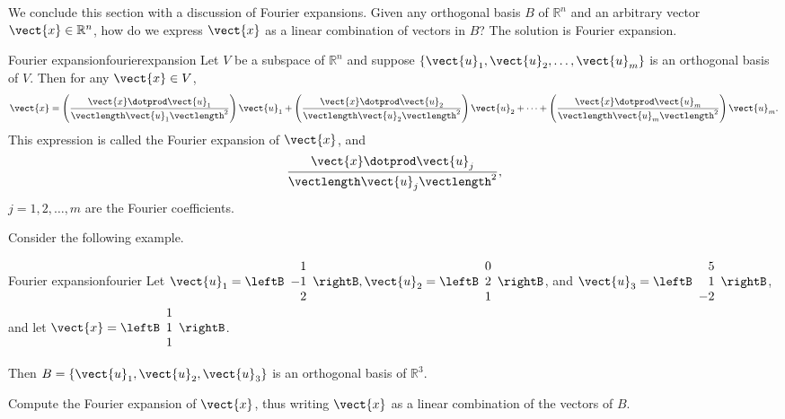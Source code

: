 We conclude this section with a discussion of Fourier expansions. Given any orthogonal basis $B$ of $\mathbb{R}^n$ and an arbitrary vector $\vect{x} \in \mathbb{R}^n$, how do we express $\vect{x}$ as a linear combination of vectors in $B$? The solution is Fourier expansion. 

\begin{theorem}{Fourier expansion}{fourierexpansion}
Let $V$ be a subspace of $\mathbb{R}^n$ and suppose $\{ \vect{u}_1, \vect{u}_2, \ldots, \vect{u}_m \}$
is an orthogonal basis of $V$. 
Then for any $\vect{x}\in V$,
\[ \vect{x} = 
\left(\frac{\vect{x}\dotprod \vect{u}_1}{\vectlength \vect{u}_1 \vectlength^2}\right) \vect{u}_1 +
\left(\frac{\vect{x}\dotprod \vect{u}_2}{\vectlength \vect{u}_2 \vectlength^2}\right) \vect{u}_2 +
\cdots +
\left(\frac{\vect{x}\dotprod \vect{u}_m}{\vectlength \vect{u}_m \vectlength^2}\right) \vect{u}_m.
\]
This expression is called the Fourier expansion 
of $\vect{x}$, and 
\[ \frac{\vect{x}\dotprod \vect{u}_j}{\vectlength \vect{u}_j \vectlength^2},\]
$j=1,2,\ldots,m$
are the Fourier coefficients.
\end{theorem}

Consider the following example.

\begin{example}{Fourier expansion}{fourier}
Let
$\vect{u}_1= \leftB\begin{array}{r} 1 \\ -1 \\ 2 \end{array}\rightB,
\vect{u}_2= \leftB\begin{array}{r} 0 \\ 2 \\ 1  \end{array}\rightB$,
and
$\vect{u}_3 =\leftB\begin{array}{r} 5 \\ 1 \\ -2 \end{array}\rightB$, 
and let 
$\vect{x} =\leftB\begin{array}{r} 1 \\ 1 \\ 1 \end{array}\rightB$.

Then $B=\{ \vect{u}_1, \vect{u}_2, \vect{u}_3\}$
is an orthogonal basis of $\mathbb{R}^3$. 

Compute the Fourier expansion of $\vect{x}$, thus writing $\vect{x}$ as  a linear combination of the vectors of $B$. 
\end{example}

